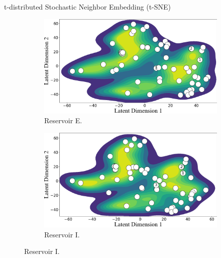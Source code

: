 \begin{frame}{t-distributed Stochastic Neighbor Embedding (t-SNE)}
	\begin{figure}[htbp]
		\centering
		\begin{subfigure}[t]{0.38\columnwidth}
			\centering
			\includegraphics[width=\columnwidth]{chp_sogp/figures/TSNE_task4_kde_p30.png}
			\caption{Reservoir E.}
		\end{subfigure}
		\hspace{0.05\columnwidth} %
		\begin{subfigure}[t]{0.38\columnwidth}
			\centering
			\includegraphics[width=\columnwidth]{chp_sogp/figures/TSNE_task8_kde_p30.png}
			\caption{Reservoir I.}
		\end{subfigure}
		
		\vspace{0.1cm} %
		

\end{figure}
\end{frame}
